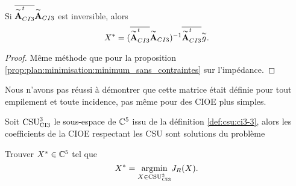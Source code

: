     \begin{prop}
      Si \(\conj{\tilde{\mA}_{CI3}^t}\tilde{\mA}_{CI3}\) est inversible, alors
      \begin{equation*}
        X^* = (\conj{\tilde{\mA}_{CI3}^t}\tilde{\mA}_{CI3})^{-1}\conj{\tilde{\mA}_{CI3}^t}\tilde{g}.
      \end{equation*}
    \end{prop}
    \begin{proof}
      Même méthode que pour la proposition \ref{prop:plan:minimisation:minimum_sans_contraintes} sur l'impédance.
    \end{proof}

    Nous n'avons pas réussi à démontrer que cette matrice était définie pour tout empilement et toute incidence, pas même pour des CIOE plus simples.

    \begin{defn}

      Soit \(\CSU[3]{CI3}\) le sous-espace de \(\CC^5\) issu de la définition \ref{def:csu:ci3-3}, alors les coefficients de la CIOE respectant les CSU sont solutions du problème

      Trouver \(X^* \in \CC^5\) tel que
      \begin{equation*}
        X^* = \argmin{X\in \CSU[3]{CI3}} J_R(X).
      \end{equation*}
    \end{defn}

    
